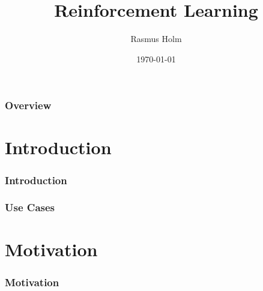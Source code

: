 \documentclass{beamer}
\title[Reinforcement Learning]{Reinforcement Learning}
\author[Rasmus Holm]{Rasmus Holm}
\institute[LiU]{
Linköping University \\
}
\date{\today}
\begin{document}

    \begin{frame}
        \titlepage
    \end{frame}

    \begin{frame}
        \frametitle{Overview}
        \tableofcontents
    \end{frame}

    \section{Introduction}

    \begin{frame}
        \frametitle{Introduction}
    \end{frame}

    \begin{frame}
        \frametitle{Use Cases}
    \end{frame}

    \section{Motivation}
    \begin{frame}
        \frametitle{Motivation}
    \end{frame}
\end{document}

